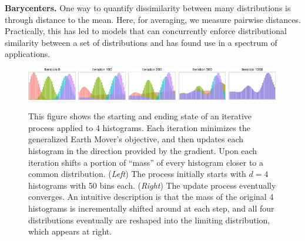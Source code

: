 {\bf Barycenters.} 
One way to quantify dissimilarity between many distributions is through distance to the mean. Here, for averaging,  
we measure pairwise distances.
Practically, this has led to models that can 
concurrently enforce distributional similarity between a 
set of distributions and has found use in 
a spectrum of applications.

\begin{figure}[ht]
    \centering
    \includegraphics[width=0.19\textwidth]{diss/6_demd/figs/hists/hists_iter_0.pdf}
    \includegraphics[width=0.19\textwidth]{diss/6_demd/figs/hists/hists_iter_100.pdf}
    \includegraphics[width=0.19\textwidth]{diss/6_demd/figs/hists/hists_iter_200.pdf}
    \includegraphics[width=0.19\textwidth]{diss/6_demd/figs/hists/hists_iter_500.pdf}
    \includegraphics[width=0.19\textwidth]{diss/6_demd/figs/hists/hists_iter_1000.pdf}
    \caption[Minimizing Generalized Earth Mover's Distance]{This figure shows the starting and ending state of an iterative process applied to 4 histograms. Each iteration minimizes the generalized Earth Mover's objective, and then updates each histogram in the direction provided by the gradient. Upon each iteration shifts a portion of ``mass'' of every histogram closer to a common distribution. ({\em Left}) The process initially starts with $d=4$ histograms with 50 bins each. ({\em Right}) The update process eventually converges. An intuitive description is that the mass of the original 4 histograms is incrementally shifted around at each step, and all four distributions eventually are reshaped into the limiting distribution, which appears at right. }
    \label{fig:hists}
\end{figure}

